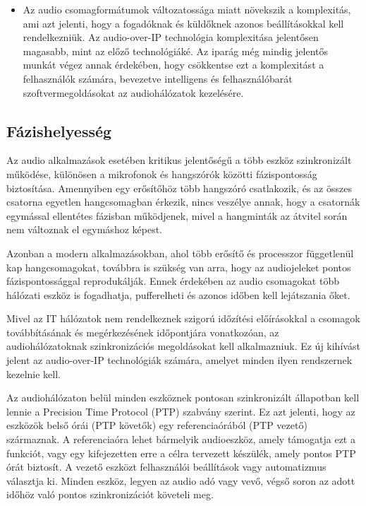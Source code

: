 \begin{itemize}
	\item Az audio csomagformátumok változatossága miatt növekszik a komplexitás,
	      ami azt jelenti, hogy a fogadóknak és küldőknek azonos beállításokkal kell
	      rendelkezniük. Az audio-over-IP technológia komplexitása jelentősen magasabb,
	      mint az előző technológiáké. Az iparág még mindig jelentős munkát végez annak
	      érdekében, hogy csökkentse ezt a komplexitást a felhasználók számára, bevezetve
	      intelligens és felhasználóbarát szoftvermegoldásokat az audiohálózatok
	      kezelésére.
\end{itemize}
\subsection{Fázishelyesség}
Az audio alkalmazások esetében kritikus jelentőségű a több eszköz szinkronizált működése, különösen a mikrofonok és hangszórók közötti fázispontosság biztosítása. Amennyiben egy erősítőhöz több hangszóró csatlakozik, és az összes csatorna egyetlen hangcsomagban érkezik, nincs veszélye annak, hogy a csatornák egymással ellentétes fázisban működjenek, mivel a hangminták az átvitel során nem változnak el egymáshoz képest.

Azonban a modern alkalmazásokban, ahol több erősítő és processzor függetlenül kap hangcsomagokat, 
továbbra is szükség van arra, hogy az audiojeleket pontos fázispontossággal reprodukálják. 
Ennek érdekében az audio csomagokat több hálózati eszköz is fogadhatja, pufferelheti és azonos időben kell lejátszania őket.

Mivel az IT hálózatok nem rendelkeznek szigorú időzítési előírásokkal a csomagok továbbításának és 
megérkezésének időpontjára vonatkozóan, az audiohálózatoknak szinkronizációs megoldásokat kell alkalmazniuk. 
Ez új kihívást jelent az audio-over-IP technológiák számára, amelyet minden ilyen rendszernek kezelnie kell.

Az audiohálózaton belül minden eszköznek pontosan szinkronizált állapotban kell lennie a Precision Time Protocol (PTP) szabvány szerint. 
Ez azt jelenti, hogy az eszközök belső órái (PTP követők) egy referenciaórából (PTP vezető) származnak. 
A referenciaóra lehet bármelyik audioeszköz, amely támogatja ezt a funkciót, vagy egy kifejezetten erre 
a célra tervezett készülék, amely pontos PTP órát biztosít. A vezető eszközt felhasználói beállítások 
vagy automatizmus választja ki. Minden eszköz, legyen az audio adó vagy vevő, végső soron az adott 
időhöz való pontos szinkronizációt követeli meg.

